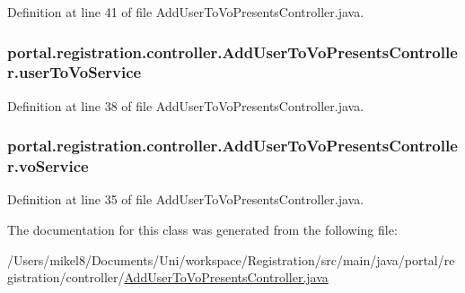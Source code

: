 Definition at line 41 of file AddUserToVoPresentsController.java.

\hypertarget{classportal_1_1registration_1_1controller_1_1AddUserToVoPresentsController_afe2ecbd7fe183c929409f1ad9247563b}{
\subsubsection[{userToVoService}]{ {\bf portal.registration.controller.AddUserToVoPresentsController.userToVoService}}}
\label{classportal_1_1registration_1_1controller_1_1AddUserToVoPresentsController_afe2ecbd7fe183c929409f1ad9247563b}


Definition at line 38 of file AddUserToVoPresentsController.java.

\hypertarget{classportal_1_1registration_1_1controller_1_1AddUserToVoPresentsController_a936c326945b8c4b2bd48e7268ba24d71}{
\subsubsection[{voService}]{ {\bf portal.registration.controller.AddUserToVoPresentsController.voService}}}
\label{classportal_1_1registration_1_1controller_1_1AddUserToVoPresentsController_a936c326945b8c4b2bd48e7268ba24d71}


Definition at line 35 of file AddUserToVoPresentsController.java.



The documentation for this class was generated from the following file:\begin{DoxyCompactItemize}
\item 
/Users/mikel8/Documents/Uni/workspace/Registration/src/main/java/portal/registration/controller/\hyperlink{AddUserToVoPresentsController_8java}{AddUserToVoPresentsController.java}\end{DoxyCompactItemize}
